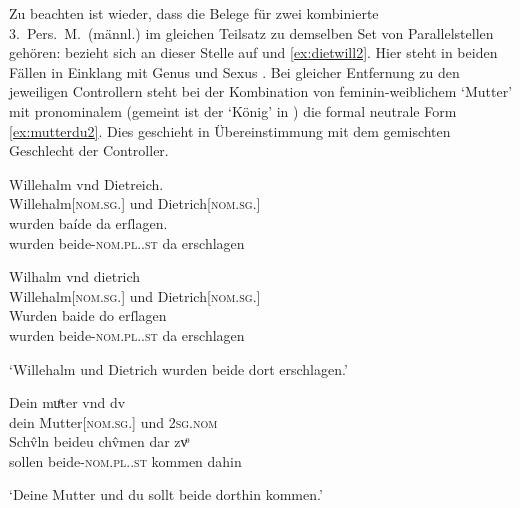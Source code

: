 Zu beachten ist wieder, dass die Belege für zwei kombinierte 3.\ Pers.\ M.\
(männl.) im gleichen Teilsatz zu demselben Set von Parallelstellen gehören:  bezieht sich an dieser Stelle auf  und 
\cref{ex:dietwill2}. Hier steht in beiden Fällen in Einklang mit Genus und
Sexus \norm{bėide}. Bei gleicher Entfernung zu den jeweiligen Controllern steht
bei der Kombination von feminin-weiblichem \lit{muͦter} `Mutter' mit
pronominalem \lit{dv} (gemeint ist der \lit{chûnig} `König' in
\cite[\pno~23\rc,~5]{kc:B1}) die formal neutrale Form 
\cref{ex:mutterdu2}. Dies geschieht in Übereinstimmung mit dem gemischten
Geschlecht der Controller.

\begin{exe}
\ex \label{ex:dietwill2} %
	\begin{xlist}
	\ex \label{ex:dietwill2_2}
		\begin{taggedline}{\parencites[\pno~83vb,36--37]{kc:C1}}
		\gll Willehalm vnd Dietreich. \\
			Willehalm[\textsc{nom.sg.\MascM}] und Dietrich[\textsc{nom.sg.\MascM}] \\
	\sn \gll wurden baíde da erſlagen. \\
			wurden beide-\textsc{nom.pl.\MascM.st} da erschlagen \\
		\end{taggedline}

	\ex \label{ex:dietwill2_3}
		\gll Wilhalm vnd dietrich \\
			Willehalm[\textsc{nom.sg.\MascM}] und Dietrich[\textsc{nom.sg.\MascM}] \\
	\sn \gll Wurden baide do erſlagen \\
			wurden beide-\textsc{nom.pl.\MascM.st} da erschlagen \\
		\begin{taggedline}{\parencites[\pno~95vb,12--13]{kc:K}}
		\trans `Willehalm und Dietrich wurden beide dort erschlagen.'
		\end{taggedline}
	\end{xlist}

\ex \label{ex:mutterdu2}
	\gll Dein muͦter vnd dv \\
		dein Mutter[\textsc{nom.sg.\FemF}] und \textsc{2sg\subM.nom} \\
\sn \gll Schv̂ln beideu chv̂men {dar zvͦ} \\
		sollen beide-\textsc{nom.pl.\NeutMF.st} kommen dahin \\
	\begin{taggedline}{\parencites(3/1 Wortformen, gleicher Teilsatz)[\pno~23rc,13--14]{kc:B1}}
	\trans `Deine Mutter und du sollt beide dorthin kommen.'
	\end{taggedline}
\end{exe}

